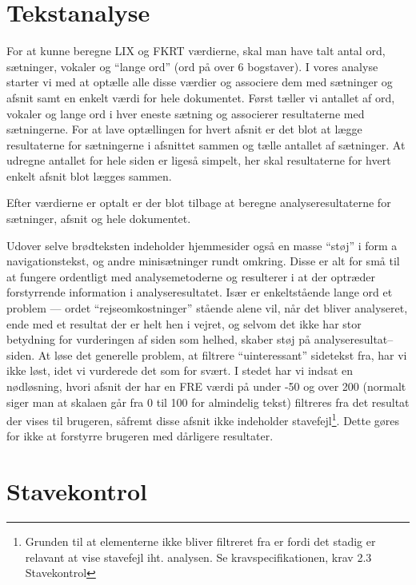 \documentclass[a4paper,oneside]{memoir}
\begin{document}
\section{Tekstanalyse}
\label{tekstanalyse}

For at kunne beregne LIX og FKRT værdierne, skal man have talt antal
ord, sætninger, vokaler og ``lange ord'' (ord på over 6 bogstaver).
I vores analyse starter vi med at optælle alle disse værdier og
associere dem med sætninger og afsnit samt en enkelt værdi for hele
dokumentet. Først tæller vi antallet af ord, vokaler og lange ord i
hver eneste sætning og associerer resultaterne med sætningerne. For at
lave optællingen for hvert afsnit er det blot at lægge resultaterne
for sætningerne i afsnittet sammen og tælle antallet af sætninger.
At udregne antallet for hele siden er ligeså simpelt, her skal
resultaterne for hvert enkelt afsnit blot lægges sammen.

Efter værdierne er optalt er der blot tilbage at beregne
analyseresultaterne for sætninger, afsnit og hele dokumentet.

Udover selve brødteksten indeholder hjemmesider også en masse ``støj''
i form a navigationstekst, og andre minisætninger rundt omkring. Disse
er alt for små til at fungere ordentligt med analysemetoderne og
resulterer i at der optræder forstyrrende information i
analyseresultatet. Især er enkeltstående lange ord et problem ---
ordet ``rejseomkostninger'' stående alene vil, når det bliver
analyseret, ende med et resultat der er helt hen i vejret, og selvom
det ikke har stor betydning for vurderingen af siden som helhed,
skaber støj på analyseresultat--siden. At løse det generelle problem,
at filtrere ``uinteressant'' sidetekst fra, har vi ikke løst, idet vi
vurderede det som for svært. I stedet har vi indsat en nødløsning,
hvori afsnit der har en FRE værdi på under -50 og over 200 (normalt
siger man at skalaen går fra 0 til 100 for almindelig tekst) filtreres
fra det resultat der vises til brugeren, såfremt disse afsnit ikke
indeholder stavefejl\footnote{Grunden til at elementerne ikke bliver
  filtreret fra er fordi det stadig er relavant at vise stavefejl
  iht. analysen. Se kravspecifikationen, krav 2.3 Stavekontrol}. Dette
gøres for ikke at forstyrre brugeren med dårligere resultater.

\section{Stavekontrol}
\label{spellchecker}
\end{document}
